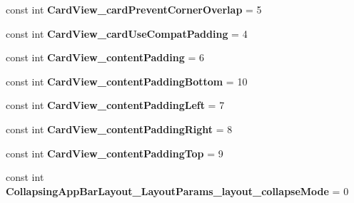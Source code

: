 \begin{DoxyCompactItemize}
\item 
\hypertarget{classClient_1_1Droid_1_1Resource_1_1Styleable_ab22b5e288e8e325d55b8049a93c01af7}{}const int {\bfseries Card\+View\+\_\+card\+Prevent\+Corner\+Overlap} = 5\label{classClient_1_1Droid_1_1Resource_1_1Styleable_ab22b5e288e8e325d55b8049a93c01af7}

\item 
\hypertarget{classClient_1_1Droid_1_1Resource_1_1Styleable_aca2d5b26ff257d9b9d2a1409c9df3ce6}{}const int {\bfseries Card\+View\+\_\+card\+Use\+Compat\+Padding} = 4\label{classClient_1_1Droid_1_1Resource_1_1Styleable_aca2d5b26ff257d9b9d2a1409c9df3ce6}

\item 
\hypertarget{classClient_1_1Droid_1_1Resource_1_1Styleable_a77441c6bf5694da986ee02e3f12bfbef}{}const int {\bfseries Card\+View\+\_\+content\+Padding} = 6\label{classClient_1_1Droid_1_1Resource_1_1Styleable_a77441c6bf5694da986ee02e3f12bfbef}

\item 
\hypertarget{classClient_1_1Droid_1_1Resource_1_1Styleable_a190eed2cb3800f2480efa58f214fcfdd}{}const int {\bfseries Card\+View\+\_\+content\+Padding\+Bottom} = 10\label{classClient_1_1Droid_1_1Resource_1_1Styleable_a190eed2cb3800f2480efa58f214fcfdd}

\item 
\hypertarget{classClient_1_1Droid_1_1Resource_1_1Styleable_a93af0746801223b49bd231cec4e296b2}{}const int {\bfseries Card\+View\+\_\+content\+Padding\+Left} = 7\label{classClient_1_1Droid_1_1Resource_1_1Styleable_a93af0746801223b49bd231cec4e296b2}

\item 
\hypertarget{classClient_1_1Droid_1_1Resource_1_1Styleable_a35ff731434e9615f1bcd4236081edc8b}{}const int {\bfseries Card\+View\+\_\+content\+Padding\+Right} = 8\label{classClient_1_1Droid_1_1Resource_1_1Styleable_a35ff731434e9615f1bcd4236081edc8b}

\item 
\hypertarget{classClient_1_1Droid_1_1Resource_1_1Styleable_a49f010934ab602db1d15daed1c303b4a}{}const int {\bfseries Card\+View\+\_\+content\+Padding\+Top} = 9\label{classClient_1_1Droid_1_1Resource_1_1Styleable_a49f010934ab602db1d15daed1c303b4a}

\item 
\hypertarget{classClient_1_1Droid_1_1Resource_1_1Styleable_a814f58874ce77fa0e53345652d629ad8}{}const int {\bfseries Collapsing\+App\+Bar\+Layout\+\_\+\+Layout\+Params\+\_\+layout\+\_\+collapse\+Mode} = 0\label{classClient_1_1Droid_1_1Resource_1_1Styleable_a814f58874ce77fa0e53345652d629ad8}


\end{DoxyCompactItemize}
